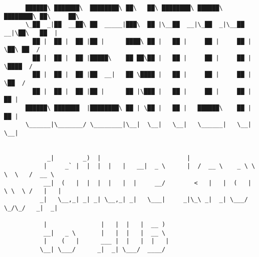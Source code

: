 \documentclass[varwidth=\maxdimen,margin=0.5cm,multi={verbatim}]{standalone}
\begin{document}
\begin{verbatim}
      ██████\ ███████\  ████████\ ██\   ██\ ████████\ ██████\ ████████\ ██\     ██\
      \_██  _|██  __██\ ██  _____|███\  ██ |\__██  __|\_██  _|\__██  __|\██\   ██  |
        ██ |  ██ |  ██ |██ |      ████\ ██ |   ██ |     ██ |     ██ |    \██\ ██  /
        ██ |  ██ |  ██ |█████\    ██ ██\██ |   ██ |     ██ |     ██ |     \████  /
        ██ |  ██ |  ██ |██  __|   ██ \████ |   ██ |     ██ |     ██ |      \██  /
        ██ |  ██ |  ██ |██ |      ██ |\███ |   ██ |     ██ |     ██ |       ██ |
      ██████\ ███████  |████████\ ██ | \██ |   ██ |   ██████\    ██ |       ██ |
      \______|\_______/ \________|\__|  \__|   \__|   \______|   \__|       \__|


            _|        _)  |                        |
           |     _` |  |  |  |   |   __|  _ \      |  /  __ \    _ \ \ \  \   /  __ \
           __|  (   |  |  |  |   |  |     __/        <   |   |  (   | \ \  \ /   |   |
          _|   \__,_| _| _| \__,_| _|   \___|     _|\_\ _|  _| \___/   \_/\_/   _|  _|

           |               |   |  |   |  __ )
           __|   _ \       |   |  |   |  __ \
           |    (   |      ___ |  |   |  |   |
          \__| \___/      _|  _| \___/  ____/



\end{verbatim}
\end{document}
